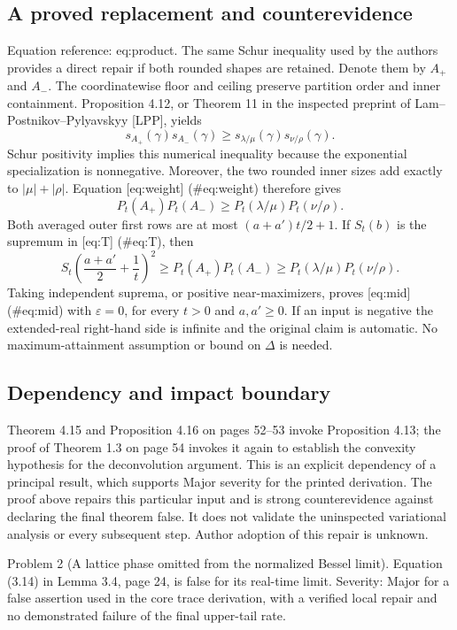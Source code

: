 \documentclass[10pt]{article}
\begin{document}
\subsection*{A proved replacement and counterevidence}
Equation reference: eq:product. The same Schur inequality used by the authors provides a direct repair if both rounded shapes are retained. Denote them by \(A_+\) and \(A_-\). The coordinatewise floor and ceiling preserve partition order and inner containment. Proposition 4.12, or Theorem 11 in the inspected preprint of Lam–Postnikov–Pylyavskyy [LPP], yields \[s_{A_+}(\gamma)s_{A_-}(\gamma)
 \ge s_{\lambda/\mu}(\gamma)s_{\nu/\rho}(\gamma).\] Schur positivity implies this numerical inequality because the exponential specialization is nonnegative. Moreover, the two rounded inner sizes add exactly to \(|\mu|+|\rho|\). Equation [eq:weight] (\#eq:weight) therefore gives \[
 P_t(A_+)P_t(A_-)\ge P_t(\lambda/\mu)P_t(\nu/\rho).\] Both averaged outer first rows are at most \((a+a')t/2+1\). If \(S_t(b)\) is the supremum in [eq:T] (\#eq:T), then \[S_t\left(\frac{a+a'}2+\frac1t\right)^2
 \ge P_t(A_+)P_t(A_-)
 \ge P_t(\lambda/\mu)P_t(\nu/\rho).\] Taking independent suprema, or positive near-maximizers, proves [eq:mid] (\#eq:mid) with \(\varepsilon=0\), for every \(t>0\) and \(a,a'\ge0\). If an input is negative the extended-real right-hand side is infinite and the original claim is automatic. No maximum-attainment assumption or bound on \(\Delta\) is needed.\par
\subsection*{Dependency and impact boundary}
Theorem 4.15 and Proposition 4.16 on pages 52–53 invoke Proposition 4.13; the proof of Theorem 1.3 on page 54 invokes it again to establish the convexity hypothesis for the deconvolution argument. This is an explicit dependency of a principal result, which supports Major severity for the printed derivation. The proof above repairs this particular input and is strong counterevidence against declaring the final theorem false. It does not validate the uninspected variational analysis or every subsequent step. Author adoption of this repair is unknown.\par
Problem 2 (A lattice phase omitted from the normalized Bessel limit).  Equation (3.14) in Lemma 3.4, page 24, is false for its real-time limit. Severity: Major for a false assertion used in the core trace derivation, with a verified local repair and no demonstrated failure of the final upper-tail rate.\par
\end{document}
